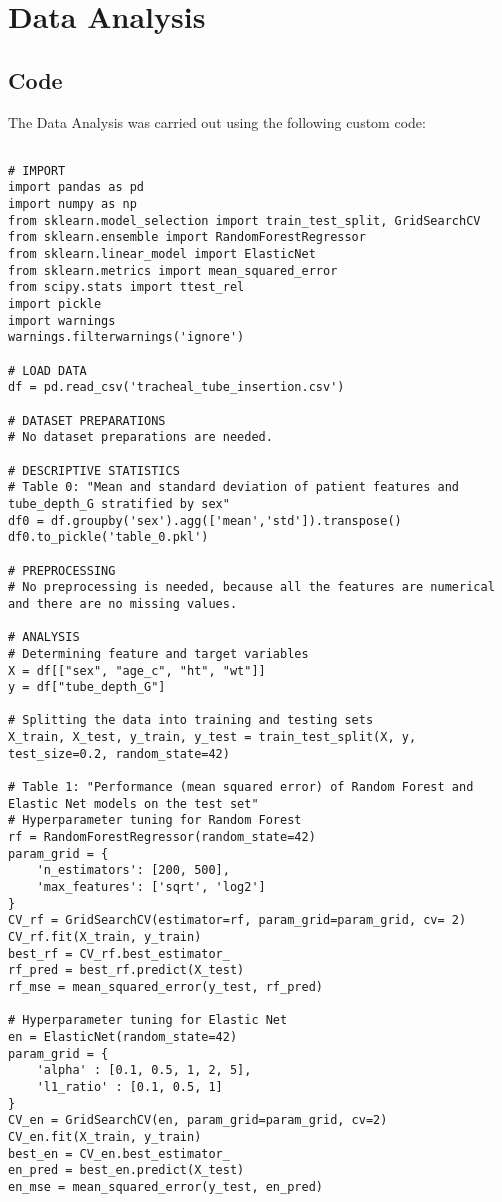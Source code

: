 \documentclass[11pt]{article}
\begin{document}
\section{Data Analysis}
\subsection{{Code}}
The Data Analysis was carried out using the following custom code:

\begin{verbatim}

# IMPORT
import pandas as pd
import numpy as np
from sklearn.model_selection import train_test_split, GridSearchCV
from sklearn.ensemble import RandomForestRegressor
from sklearn.linear_model import ElasticNet
from sklearn.metrics import mean_squared_error
from scipy.stats import ttest_rel
import pickle
import warnings
warnings.filterwarnings('ignore')

# LOAD DATA
df = pd.read_csv('tracheal_tube_insertion.csv')

# DATASET PREPARATIONS
# No dataset preparations are needed.

# DESCRIPTIVE STATISTICS
# Table 0: "Mean and standard deviation of patient features and tube_depth_G stratified by sex"
df0 = df.groupby('sex').agg(['mean','std']).transpose()
df0.to_pickle('table_0.pkl')

# PREPROCESSING 
# No preprocessing is needed, because all the features are numerical and there are no missing values.

# ANALYSIS
# Determining feature and target variables
X = df[["sex", "age_c", "ht", "wt"]]
y = df["tube_depth_G"]

# Splitting the data into training and testing sets
X_train, X_test, y_train, y_test = train_test_split(X, y, test_size=0.2, random_state=42)

# Table 1: "Performance (mean squared error) of Random Forest and Elastic Net models on the test set"
# Hyperparameter tuning for Random Forest
rf = RandomForestRegressor(random_state=42)
param_grid = {
    'n_estimators': [200, 500],
    'max_features': ['sqrt', 'log2']
}
CV_rf = GridSearchCV(estimator=rf, param_grid=param_grid, cv= 2)
CV_rf.fit(X_train, y_train)
best_rf = CV_rf.best_estimator_
rf_pred = best_rf.predict(X_test)
rf_mse = mean_squared_error(y_test, rf_pred)

# Hyperparameter tuning for Elastic Net
en = ElasticNet(random_state=42)
param_grid = {
    'alpha' : [0.1, 0.5, 1, 2, 5],
    'l1_ratio' : [0.1, 0.5, 1]
}
CV_en = GridSearchCV(en, param_grid=param_grid, cv=2)
CV_en.fit(X_train, y_train)
best_en = CV_en.best_estimator_
en_pred = best_en.predict(X_test)
en_mse = mean_squared_error(y_test, en_pred)


\end{verbatim}
\end{document}
